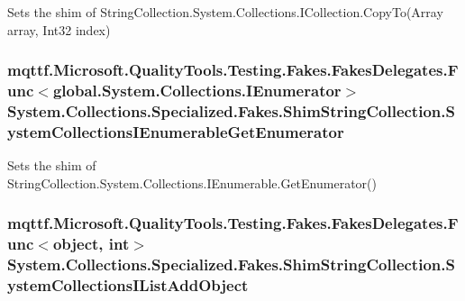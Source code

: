 Sets the shim of String\-Collection.\-System.\-Collections.\-I\-Collection.\-Copy\-To(\-Array array, Int32 index)

\hypertarget{class_system_1_1_collections_1_1_specialized_1_1_fakes_1_1_shim_string_collection_a71262486ced59e4656222022d973a0a0}{
\subsubsection[{System\-Collections\-I\-Enumerable\-Get\-Enumerator}]{\setlength{\rightskip}{0pt plus 5cm}mqttf.\-Microsoft.\-Quality\-Tools.\-Testing.\-Fakes.\-Fakes\-Delegates.\-Func$<$global.\-System.\-Collections.\-I\-Enumerator$>$ System.\-Collections.\-Specialized.\-Fakes.\-Shim\-String\-Collection.\-System\-Collections\-I\-Enumerable\-Get\-Enumerator\hspace{0.3cm}{\ttfamily [set]}}}\label{class_system_1_1_collections_1_1_specialized_1_1_fakes_1_1_shim_string_collection_a71262486ced59e4656222022d973a0a0}


Sets the shim of String\-Collection.\-System.\-Collections.\-I\-Enumerable.\-Get\-Enumerator()

\hypertarget{class_system_1_1_collections_1_1_specialized_1_1_fakes_1_1_shim_string_collection_aef91020ed4e338be2eb5af1287787ef1}{
\subsubsection[{System\-Collections\-I\-List\-Add\-Object}]{\setlength{\rightskip}{0pt plus 5cm}mqttf.\-Microsoft.\-Quality\-Tools.\-Testing.\-Fakes.\-Fakes\-Delegates.\-Func$<$object, int$>$ System.\-Collections.\-Specialized.\-Fakes.\-Shim\-String\-Collection.\-System\-Collections\-I\-List\-Add\-Object\hspace{0.3cm}{\ttfamily [set]}}}\label{class_system_1_1_collections_1_1_specialized_1_1_fakes_1_1_shim_string_collection_aef91020ed4e338be2eb5af1287787ef1}


